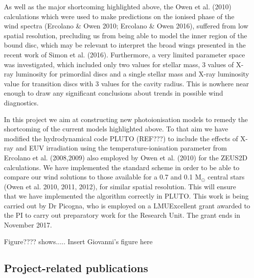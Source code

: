 \documentclass[10pt,fleqn,twoside]{article}
\newcommand{\Tcol}{\color{blue}}
\begin{document}
As well as the major shortcoming highlighted above, the Owen et
al. (2010) calculations which were used to make predictions on
the ionised phase of the wind spectra (Ercolano \& Owen 2010;
Ercolano \& Owen 2016), suffered from low spatial resolution,
precluding us from being able to model the inner region of the bound disc, which
may be relevant to interpret the broad wings presented in the recent
work of Simon et al. (2016). Furthermore, a very limited
parameter space was investigated, which included only two values for
stellar mass, 3 values of X-ray luminosity for primordial discs and a
single stellar mass and X-ray luminosity value for transition discs
with 3 values for the cavity radius. This is nowhere near enough to draw any
significant conclusions about trends in possible wind diagnostics. 

In this project we aim at constructing new photoionisation models to
remedy the shortcoming of the current models highlighted above. To
that aim we have modified the hydrodynamical code PLUTO (REF???) to include the
effects of X-ray and EUV irradiation using the temperature-ionisation
parameter from Ercolano et al. (2008,2009) also employed by Owen et
al. (2010) for the ZEUS2D calculations. We have implemented the
standard scheme in order to be able to compare our wind solutions to 
those available for a 0.7 and 0.1 M$_\odot$ central
stars (Owen et al. 2010, 2011, 2012), for similar spatial
resolution. This will ensure that we have implemented the algorithm
correctly in PLUTO.  This work is being carried out by Dr Picogna, who
is employed on a LMUExcellent grant awarded to the PI to carry out
preparatory work for the Research Unit. The grant ends in November
2017. 

Figure???? shows..... {\color{red} Insert Giovanni's figure here}


\subsection{\Tcol Project-related publications}

\end{document}
